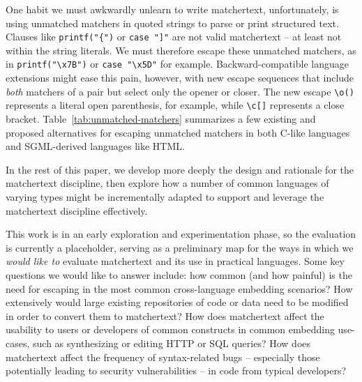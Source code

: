 One habit we must awkwardly unlearn to write matchertext,
unfortunately,
is using unmatched matchers in quoted strings
to parse or print structured text.
Clauses like \verb|printf("{")| or \verb|case "]"|
are not valid matchertext --
at least not within the string literals.
We must therefore escape these unmatched matchers,
as in \verb|printf("\x7B")| or \verb|case "\x5D"| for example.
Backward-compatible language extensions might ease this pain,
however, 
with new escape sequences that include \emph{both} matchers of a pair
but select only the opener or closer.
The new escape \verb|\o()| represents a literal open parenthesis,
for example,
while \verb|\c[]| represents a close bracket.
Table~\ref{tab:unmatched-matchers} summarizes a few existing and proposed
alternatives for escaping unmatched matchers
in both C-like languages and SGML-derived languages like HTML.

In the rest of this paper, 
we develop more deeply the design and rationale for the matchertext discipline,
then explore how a number of common languages of varying types
might be incrementally adapted to support and leverage
the matchertext discipline effectively.

This work is in an early exploration and experimentation phase,
so the evaluation is currently a placeholder,
serving as a preliminary map for the ways in which
we \emph{would like to} evaluate matchertext
and its use in practical languages.
Some key questions we would like to answer include:
how common (and how painful) is the need for escaping
in the most common cross-language embedding scenarios?
How extensively would large existing repositories of code or data
need to be modified in order to convert them to matchertext?
How does matchertext affect the usability to users or developers
of common constructs in common embedding use-cases,
such as synthesizing or editing HTTP or SQL queries?
How does matchertext affect the frequency of syntax-related bugs --
especially those potentially leading to security vulnerabilities --
in code from typical developers?



